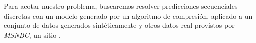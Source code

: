 Para acotar nuestro problema, buscaremos resolver predicciones secuenciales discretas con un modelo generado por un algoritmo de compresión, aplicado a un conjunto de datos generados sintéticamente y otros datos real provistos por \emph{MSNBC}\cite{Claude2014}, un sitio \web. 


